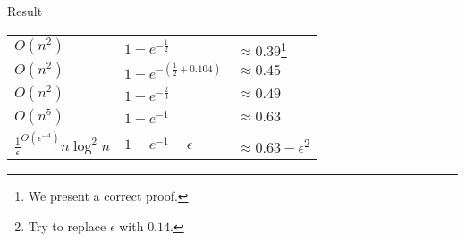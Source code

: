 \begin{frame}{Result}
    \begin{center}
        \Large
        \begin{tabular}{l l l}
            \hline
            $O(n^2)$
            &
            $1 - e^{-\frac{1}{2}}$
            &
            $\approx 0.39$\footnote{We present a correct proof.}
            \\
            \color{orange}$O(n^2)$
            &
            \color{orange}$1 - e^{-(\frac{1}{2} + 0.104)}$
            &
            $\approx 0.45$
            \\
            \color{orange}$O(n^2)$
            & 
            \color{orange}$1 - e^{-\frac{2}{3}}$ 
            &
            $\approx 0.49$
            \\
            $O(n^5)$
            & 
            $1 - e^{-1}$ 
            &
            $\approx 0.63$
            \\
            $\frac{1}{\epsilon}^{O(\epsilon^{-4})}n \log^2 n$
            & 
            $1 - e^{-1} - \epsilon$ 
            &
            $\approx 0.63 - \epsilon$\footnote{Try to replace $\epsilon$ with $0.14$.}
            \\
            \hline
        \end{tabular}
        
    \end{center}
\end{frame}